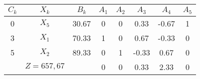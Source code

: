     \begin{tabular}{cccccccc}
    \hline
    \hline
    $C_k$   & $X_k$   & $B_k$   & $A_1$   & $A_2$   & $A_3$   & $A_4$   & $A_5$ \bigstrut\\
    \hline
    0       & $X_5$   & 30.67   & 0       & 0       & 0.33    & -0.67   & 1 \bigstrut[t]\\
    3       & $X_1$   & 70.33   & 1       & 0       & 0.67    & -0.33   & 0 \\
    5       & $X_2$   & 89.33   & 0       & 1       & -0.33   & 0.67    & 0 \bigstrut[b]\\
    \hline
            & $Z=657,67$ &         & 0       & 0       & 0.33    & 2.33    & 0 \bigstrut\\
    \hline
    \hline
    \end{tabular}%
